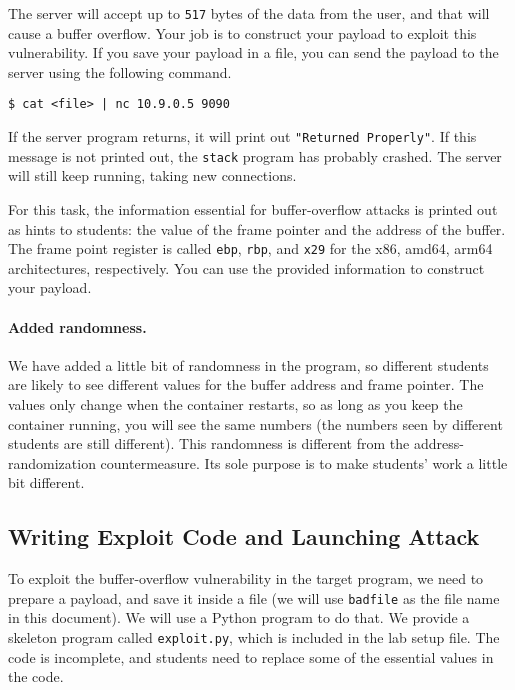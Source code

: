 The server will accept up to \texttt{517} bytes of the data from the 
user, and that will cause a buffer overflow. Your job 
is to construct your payload to exploit this vulnerability. If 
you save your payload in a file, you can send the payload
to the server using the following command.

\begin{lstlisting}
$ cat <file> | nc 10.9.0.5 9090
\end{lstlisting}

If the server program returns, it will print out \texttt{"Returned Properly"}.
If this message is not printed out, the \texttt{stack} program has probably crashed. 
The server will still keep running, taking new connections.  

For this task, the information essential for buffer-overflow 
attacks is printed out as hints to students: 
the value of the frame pointer and the address
of the buffer. 
The frame point register is called \texttt{ebp}, \texttt{rbp},
and \texttt{x29} for the x86, amd64, arm64 architectures, respectively. 
You can use the provided information to construct your payload. 


\paragraph{Added randomness.} We have added a little bit of randomness
in the program, so different students are likely to see different values
for the buffer address and frame pointer. The values only change 
when the container restarts, so as long as you keep the 
container running, you will see the same numbers (the numbers 
seen by different students are still different). This randomness
is different from the address-randomization countermeasure. Its sole
purpose is to make students' work a little bit different. 


\subsection{Writing Exploit Code and Launching Attack} 

To exploit the buffer-overflow vulnerability in the target program,
we need to prepare a payload, and save it inside a file (we will use 
\texttt{badfile} as the file name in this document). 
We will use a Python program to do that.
We provide a skeleton program called \texttt{exploit.py}, which
is included in the lab setup file. 
The code is incomplete, and students need to replace some of the essential 
values in the code. 



